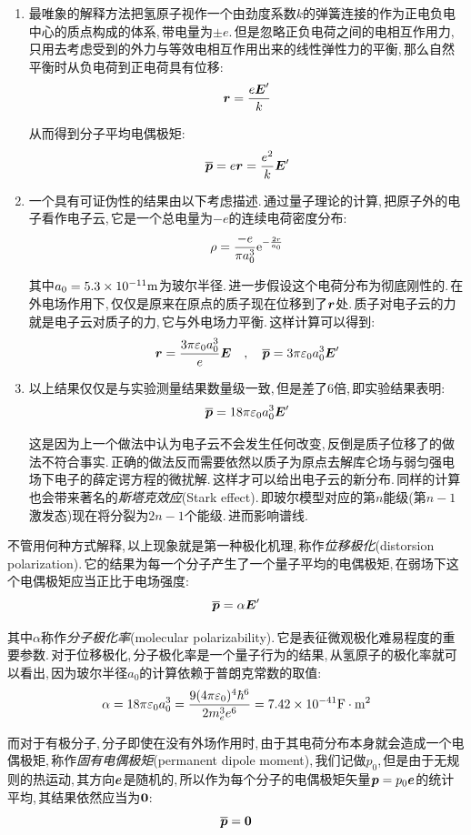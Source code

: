 \begin{enumerate}
\item 最唯象的解释方法把氢原子视作一个由劲度系数$k$的弹簧连接的作为正电负电中心的质点构成的体系,\,带电量为$\pm e$.\,但是忽略正负电荷之间的电相互作用力,\,只用去考虑受到的外力与等效电相互作用出来的线性弹性力的平衡,\,那么自然平衡时从负电荷到正电荷具有位移:
\[\boldsymbol{r}=\frac{e\boldsymbol{E}'}{k}\]

从而得到分子平均电偶极矩:
\[\overline{\boldsymbol{p}}=e\boldsymbol{r}=\frac{e^2}{k}\boldsymbol{E}'\]

\item 一个具有可证伪性的结果由以下考虑描述.\,通过量子理论的计算,\,把原子外的电子看作电子云,\,它是一个总电量为$-e$的连续电荷密度分布:
$$
\rho =\frac{-e}{\pi a_{0}^{3}}{\rm e}^{-\frac{2r}{a_0}}
$$

其中$a_0=5.3\times 10^{-11}{\rm m}$为玻尔半径.\,进一步假设这个电荷分布为彻底刚性的.\,在外电场作用下,\,仅仅是原来在原点的质子现在位移到了$\boldsymbol{r}$处.\,质子对电子云的力就是电子云对质子的力,\,它与外电场力平衡.\,这样计算可以得到:
\[\boldsymbol{r}=\frac{3\pi\varepsilon_0 a_0^3}{e}\boldsymbol{E}\quad ,\quad \overline{\boldsymbol{p}}=3\pi\varepsilon_0 a_0^3\boldsymbol{E}'\]

\item 以上结果仅仅是与实验测量结果数量级一致,\,但是差了$6$倍,\,即实验结果表明:
\[\overline{\boldsymbol{p}}=18\pi\varepsilon_0 a_0^3\boldsymbol{E}'\]

这是因为上一个做法中认为电子云不会发生任何改变,\,反倒是质子位移了的做法不符合事实.\,正确的做法反而需要依然以质子为原点去解库仑场与弱匀强电场下电子的薛定谔方程的微扰解.\,这样才可以给出电子云的新分布.\,同样的计算也会带来著名的\emph{斯塔克效应}(Stark effect).\,即玻尔模型对应的第$n$能级(第$n-1$激发态)现在将分裂为$2n-1$个能级.\,进而影响谱线.

\end{enumerate}

不管用何种方式解释,\,以上现象就是第一种极化机理,\,称作\emph{位移极化}(distorsion polarization).\,它的结果为每一个分子产生了一个量子平均的电偶极矩,\,在弱场下这个电偶极矩应当正比于电场强度:
\[\overline{\boldsymbol{p}}=\alpha \boldsymbol{E}'\]

其中$\alpha$称作\emph{分子极化率}(molecular polarizability).\,它是表征微观极化难易程度的重要参数.\,对于位移极化,\,分子极化率是一个量子行为的结果,\,从氢原子的极化率就可以看出,\,因为玻尔半径$a_0$的计算依赖于普朗克常数的取值:
\[\alpha =18\pi\varepsilon_0 a_0^3=\frac{9(4\pi\varepsilon_0)^4\hbar^6}{2m_e^3e^6}=7.42\times 10^{-41} {\rm F\cdot m^2}\]
\vspace{1cm}

而对于有极分子,\,分子即使在没有外场作用时,\,由于其电荷分布本身就会造成一个电偶极矩,\,称作\emph{固有电偶极矩}(permanent dipole moment),\,我们记做$p_0$,\,但是由于无规则的热运动,\,其方向$\boldsymbol{e}$是随机的,\,所以作为每个分子的电偶极矩矢量$\boldsymbol{p}=p_0\boldsymbol{e}$的统计平均,\,其结果依然应当为$\boldsymbol{0}$:
\[\overline{\boldsymbol{p}}=\boldsymbol{0}\]

